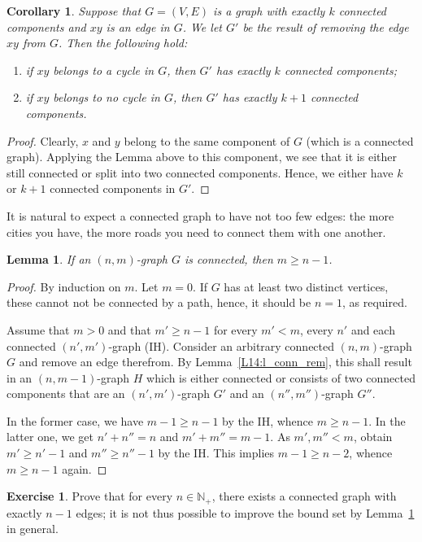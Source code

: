 \documentclass[12pt,notitlepage]{article}
\theoremstyle{plain}
\newtheorem{lemma}[thm]{Lemma}
\newtheorem{corr}[thm]{Corollary}
\theoremstyle{definition}
\newtheorem{exc}[thm]{Exercise}
\theoremstyle{plain}
\newcommand{\N}{\mathbb{N}}
\newcommand{\1}{\mathbf{1}}
\newcommand{\0}{\mathbf{0}}
\begin{document}
\begin{corr}\label{L14:c_conn_rem}
Suppose that $G = (V, E)$ is a graph with exactly $k$ connected components and $xy$ is an edge in $G$. We let $G'$ be the result of removing the edge $xy$ from $G$. Then the following hold:
\begin{enumerate}
\item if $xy$ belongs to a cycle in $G$, then $G'$ has exactly $k$ connected components;
\item if $xy$ belongs to no cycle in $G$, then $G'$ has exactly $k + 1$ connected components.
\end{enumerate}
\end{corr}
\begin{proof}
Clearly, $x$ and $y$ belong to the same component of $G$ (which is a connected graph). Applying the Lemma above to this component, we see that it is either still connected or split into two connected components. Hence, we either have $k$ or $k + 1$ connected components in $G'$.
\end{proof}

It is natural to expect a connected graph to have not too few edges: the more cities you have, the more roads you need to connect them with one another.
\begin{lemma}\label{L14:conn_edge_num}
If an $(n,m)$-graph $G$ is connected, then $m \geq n - 1$.
\end{lemma}
\begin{proof}
By induction on $m$. Let $m = 0$. If $G$ has at least two distinct vertices, these cannot not be connected by a path, hence, it should be $n = 1$, as required.

Assume that $m > 0$ and that $m' \geq n - 1$ for every $m' < m$, every $n'$ and each connected $(n',m')$-graph (IH). Consider an arbitrary connected $(n, m)$-graph $G$ and remove an edge therefrom. By Lemma~\ref{L14:l_conn_rem}, this shall result in an $(n,m - 1)$-graph $H$ which is either connected or consists of two connected components that are an $(n',m')$-graph $G'$ and an $(n'', m'')$-graph $G''$.

In the former case, we have $m - 1 \geq n - 1$ by the IH, whence $m \geq n - 1$. In the latter one, we get $n' + n'' = n$ and $m' + m'' = m - 1$. As $m', m'' < m$, obtain $m' \geqslant n' - 1$ and $m'' \geqslant n'' - 1$ by the IH. This implies $m - 1 \geq n - 2$, whence $m \geq n - 1$ again.
\end{proof}

\begin{exc}
Prove that for every $n \in \N_+$, there exists a connected graph with exactly $n - 1$ edges; it is not thus possible to improve the bound set by Lemma~\ref{L14:conn_edge_num} in general.
\end{exc}
\end{document}
